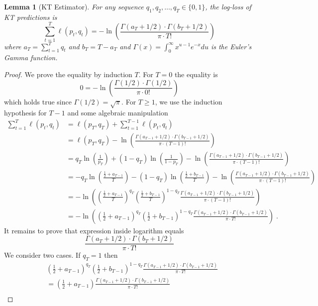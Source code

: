 \documentclass{article}
\newtheorem{lemma}[theorem]{Lemma}
\begin{document}
\begin{lemma}[KT Estimator]
For any sequence $q_1, q_2, \dots, q_T \in \{0,1\}$, the log-loss of KT predictions is
$$
\sum_{t=1}^T \ell(p_t, q_t) =  - \ln \left( \frac{\Gamma(a_T + 1/2) \cdot \Gamma(b_T + 1/2)}{\pi \cdot T!} \right)
$$
where $a_T = \sum_{t=1}^T q_t$ and $b_T = T - a_T$ and $\Gamma(x) = \int_0^\infty x^{u-1} e^{-x} du$ is the Euler's Gamma function.
\end{lemma}

\begin{proof}
We prove the equality by induction $T$. For $T=0$ the equality is
$$
0 = - \ln \left( \frac{\Gamma(1/2) \cdot \Gamma(1/2)}{\pi \cdot 0!} \right)
$$
which holds true since $\Gamma(1/2) = \sqrt{\pi}$.
For $T \ge 1$, we use the induction hypothesis for $T-1$ and some algebraic manipulation
\begin{align*}
\sum_{t=1}^T \ell(p_t, q_t)
& = \ell(p_T, q_T) + \sum_{t=1}^{T-1} \ell(p_t, q_t) \\
& = \ell(p_T, q_T) - \ln \left( \frac{\Gamma(a_{T-1} + 1/2) \cdot \Gamma(b_{T-1} + 1/2)}{\pi \cdot (T-1)!} \right) \\
& = q_T \ln\left( \frac{1}{p_T}\right) + (1-q_T) \ln  \left( \frac{1}{1 - p_T} \right) - \ln \left( \frac{\Gamma(a_{T-1} + 1/2) \cdot \Gamma(b_{T-1} + 1/2)}{\pi \cdot (T-1)!} \right) \\
& = - q_T \ln\left( \frac{\frac{1}{2} + a_{T-1}}{T} \right) - (1-q_T) \ln\left( \frac{\frac{1}{2} + b_{T-1}}{T} \right) - \ln \left( \frac{\Gamma(a_{T-1} + 1/2) \cdot \Gamma(b_{T-1} + 1/2)}{\pi \cdot (T-1)!} \right) \\
& = - \ln\left( \left( \frac{\frac{1}{2} + a_{T-1}}{T} \right)^{q_T} \left( \frac{\frac{1}{2} + b_{T-1}}{T} \right)^{1-q_T} \frac{\Gamma(a_{T-1} + 1/2) \cdot \Gamma(b_{T-1} + 1/2)}{\pi \cdot (T-1)!} \right) \\
& = - \ln\left( \left( \frac{1}{2} + a_{T-1} \right)^{q_T} \left( \frac{1}{2} + b_{T-1} \right)^{1-q_T} \frac{\Gamma(a_{T-1} + 1/2) \cdot \Gamma(b_{T-1} + 1/2)}{\pi \cdot T!}  \right) \; .
\end{align*}
It remains to prove that expression inside logarithm equals
$$
\frac{\Gamma(a_{T} + 1/2) \cdot \Gamma(b_T + 1/2)}{\pi \cdot T!}
$$
We consider two cases. If $q_T = 1$ then
\begin{align*}
& \left( \frac{1}{2} + a_{T-1} \right)^{q_T} \left( \frac{1}{2} + b_{T-1} \right)^{1-q_T} \frac{\Gamma(a_{T-1} + 1/2) \cdot \Gamma(b_{T-1} + 1/2)}{\pi \cdot T!} \\
& = \left( \frac{1}{2} + a_{T-1} \right) \frac{\Gamma(a_{T-1} + 1/2) \cdot \Gamma(b_{T-1} + 1/2)}{\pi \cdot T!} \\

\end{align*}
\end{proof}
\end{document}

